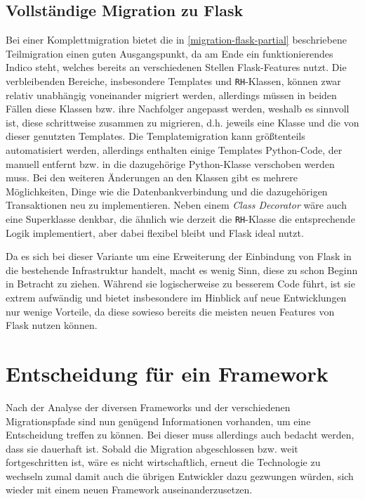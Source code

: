 \subsection{Vollständige Migration zu Flask}
Bei einer Komplettmigration bietet die in \autoref{migration-flask-partial} beschriebene
Teilmigration einen guten Ausgangspunkt, da am Ende ein funktionierendes Indico steht, welches
bereits an verschiedenen Stellen Flask-Features nutzt. Die verbleibenden Bereiche, insbesondere
Templates und \lstinline{RH}-Klassen, können zwar relativ unabhängig voneinander migriert werden,
allerdings müssen in beiden Fällen diese Klassen bzw. ihre Nachfolger angepasst werden, weshalb es
sinnvoll ist, diese schrittweise zusammen zu migrieren, d.h. jeweils eine Klasse und die von dieser
genutzten Templates. Die Templatemigration kann größtenteils automatisiert werden, allerdings
enthalten einige Templates Python-Code, der manuell entfernt bzw. in die dazugehörige Python-Klasse
verschoben werden muss. Bei den weiteren Änderungen an den Klassen gibt es mehrere Möglichkeiten,
Dinge wie die Datenbankverbindung und die dazugehörigen Transaktionen neu zu implementieren.
Neben einem \emph{Class Decorator} wäre auch eine Superklasse denkbar, die ähnlich wie derzeit die
\lstinline{RH}-Klasse die entsprechende Logik implementiert, aber dabei flexibel bleibt und Flask
ideal nutzt.

Da es sich bei dieser Variante um eine Erweiterung der Einbindung von Flask in die bestehende
Infrastruktur handelt, macht es wenig Sinn, diese zu schon Beginn in Betracht zu ziehen. Während sie
logischerweise zu besserem Code führt, ist sie extrem aufwändig und bietet insbesondere im Hinblick
auf neue Entwicklungen nur wenige Vorteile, da diese sowieso bereits die meisten neuen Features von
Flask nutzen können.


\section{Entscheidung für ein Framework}
Nach der Analyse der diversen Frameworks und der verschiedenen Migrationspfade sind nun genügend
Informationen vorhanden, um eine Entscheidung treffen zu können. Bei dieser muss allerdings auch
bedacht werden, dass sie dauerhaft ist. Sobald die Migration abgeschlossen bzw. weit fortgeschritten
ist, wäre es nicht wirtschaftlich, erneut die Technologie zu wechseln zumal damit auch die übrigen
Entwickler dazu gezwungen würden, sich wieder mit einem neuen Framework auseinanderzusetzen.


